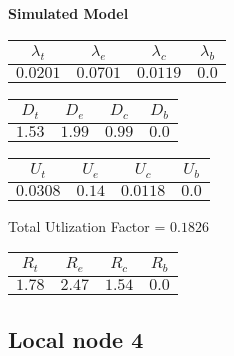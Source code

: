 \documentclass{article}
\begin{document}
\begin{minipage}{0.5\textwidth}
\centering	\textbf{Simulated Model}
\begin{table}[H]
\centering
\begin{tabular}{@{}cccc@{}}
\toprule
$\lambda_t$ & $\lambda_e$ & $\lambda_c$ & $\lambda_b$\\
\midrule
$0.0201$ & $0.0701$ & $0.0119$ & $0.0$\\
\bottomrule
\end{tabular}
\end{table}
\begin{table}[H]
\centering
\begin{tabular}{@{}cccc@{}}
\toprule
$D_t$ & $D_e$ & $D_c$ & $D_b$\\
\midrule
$1.53$ & $1.99$ & $0.99$ & $0.0$\\
\bottomrule
\end{tabular}
\end{table}\begin{table}[H]
\centering
\begin{tabular}{@{}cccc@{}}
\toprule
$U_t$ & $U_e$ & $U_c$ & $U_b$\\
\midrule
$0.0308$ & $0.14$ & $0.0118$ & $0.0$\\
\bottomrule
\end{tabular}
\end{table}
\centering Total Utlization Factor = $0.1826$
\begin{table}[H]
\centering
\begin{tabular}{@{}cccc@{}}
\toprule
$R_t$ & $R_e$ & $R_c$ & $R_b$\\
\midrule
$1.78$ & $2.47$ & $1.54$ & $0.0$\\
\bottomrule
\end{tabular}
\end{table}
\end{minipage}\subsection{Local node 4}
\end{document}
